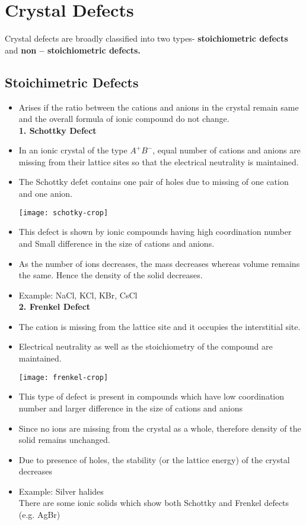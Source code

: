 \section{Crystal Defects}
Crystal defects are broadly classified into two types- \textbf{stoichiometric defects} and \textbf{non – stoichiometric defects. }
\subsection{Stoichimetric Defects}
\begin{itemize}
	\item Arises if the ratio between the cations and anions in the crystal remain same and the overall formula of ionic compound do not change.\\
	\textbf{1. Schottky Defect}
	
	\item In an ionic crystal of the type $A^{+}B^{-}$, equal number of cations and anions are missing from their lattice sites so that the electrical neutrality is maintained.
	\item The Schottky defet contains one pair of holes due to missing of one cation and one anion.\\
	\begin{minipage}{0.95\textwidth}
		\centering
		\texttt{[image: schotky-crop]}
	\end{minipage}
	\item This defect is shown by ionic compounds having high coordination number and Small difference in the size of cations and anions.
	\item As the number of ions decreases, the mass decreases whereas volume remains the same. Hence the density of the solid decreases.
	\item Example: NaCl, KCl, KBr, CsCl\\
	\textbf{2. Frenkel Defect}
	\item The cation is missing from the lattice site and it occupies the interstitial site.
	\item Electrical neutrality as well as the stoichiometry of the compound are maintained. \\
	\begin{minipage}{0.95\textwidth}
		\centering
		\texttt{[image: frenkel-crop]}
	\end{minipage}
\item This type of defect is present in compounds which have low coordination number and larger difference in the size of cations and anions
	\item Since no ions are missing from the crystal as a whole, therefore density of the solid remains unchanged. 
	\item Due to presence of holes, the stability (or the lattice energy) of the crystal decreases
	\item Example: Silver halides\\
	There are some ionic solids which show both Schottky and Frenkel defects (e.g. AgBr)
\end{itemize}
